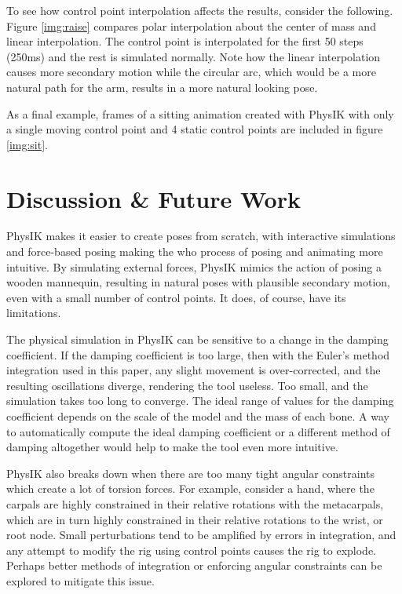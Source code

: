 \documentclass[10pt,twocolumn,letterpaper]{article}
\begin{document}
To see how control point interpolation affects the results, consider the following. Figure \ref{img:raise} compares polar interpolation about the center of mass and linear interpolation. The control point is interpolated for the first 50 steps (250ms) and the rest is simulated normally. Note how the linear interpolation causes more secondary motion while the circular arc, which would be a more natural path for the arm, results in a more natural looking pose.


As a final example, frames of a sitting animation created with PhysIK with only a single moving control point and 4 static control points are included in figure \ref{img:sit}. 


\section{Discussion \& Future Work}

PhysIK makes it easier to create poses from scratch, with interactive simulations and force-based posing making the who process of posing and animating more intuitive. By simulating external forces, PhysIK mimics the action of posing a wooden mannequin, resulting in natural poses with plausible secondary motion, even with a small number of control points. It does, of course, have its limitations.

The physical simulation in PhysIK can be sensitive to a change in the damping coefficient. If the damping coefficient is too large, then with the Euler's method integration used in this paper, any slight movement is over-corrected, and the resulting oscillations diverge, rendering the tool useless. Too small, and the simulation takes too long to converge. The ideal range of values for the damping coefficient depends on the scale of the model and the mass of each bone. A way to automatically compute the ideal damping coefficient or a different method of damping altogether would help to make the tool even more intuitive. 

PhysIK also breaks down when there are too many tight angular constraints which create a lot of torsion forces. For example, consider a hand, where the carpals are highly constrained in their relative rotations with the metacarpals, which are in turn highly constrained in their relative rotations to the wrist, or root node. Small perturbations tend to be amplified by errors in integration, and any attempt to modify the rig using control points causes the rig to explode. Perhaps better methods of integration or enforcing angular constraints can be explored to mitigate this issue.
\end{document}
